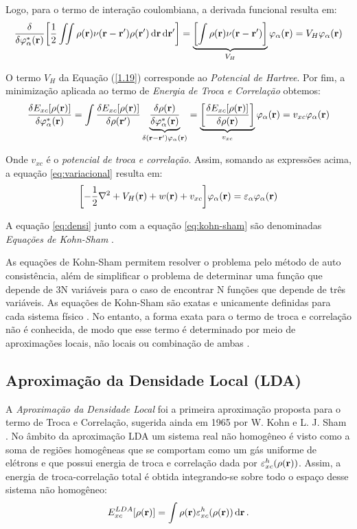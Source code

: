 Logo, para o termo de interação coulombiana, a derivada funcional resulta em:
\begin{equation}\label{1.19}
	\fdv{}{\phialfac}\bqty{\frac{1}{2}\iint \dens\nu(\vb{r}-\vb{r'})\denslinha \dr \drlinha }=\underbrace{\bqty{\int \dens \nu(\vb{r}-\vb{r'})}}_{\text{$V_H$}}\phialfa = V_H \phialfa
\end{equation}

O termo $ V_H $ da Equação (\ref{1.19}) corresponde ao \textit{Potencial de Hartree}. Por fim, a minimização aplicada ao termo de \textit{Energia de Troca e Correlação} obtemos:
\begin{equation}\label{eq:derivada_correlacao}
	\fdv{E_{xc}\bqty{\dens}}{\phialfac}=\int \fdv{E_{xc}\bqty{\dens}}{\denslinha}\underbrace{\fdv{\dens}{\phialfac}}_{\delta(\vb{r}-\vb{r'})\phialfa}=\underbrace{\bqty{\fdv{E_{xc}\bqty{\dens}}{\dens}}}_{\text{$v_{xc}$}}\phialfa = v_{xc} \phialfa
\end{equation}

Onde $ v_{xc} $ é o \textit{potencial de troca e correlação}. Assim, somando as expressões acima, a equação \eqref{eq:variacional} resulta em:
\begin{equation}\label{eq:kohn-sham}
	\bqty{-\frac{1}{2}\laplacian+V_H(\vb{r})+w(\vb{r})+v_{xc}}\phialfa=\varepsilon_{\alpha} \phialfa
\end{equation}

A equação \eqref{eq:densi} junto com a equação \eqref{eq:kohn-sham} são denominadas \textit{Equações de Kohn-Sham} \cite{lecture_KS}.

As equações de Kohn-Sham permitem resolver o problema pelo método de auto consistência, além de simplificar o problema de determinar uma função que depende de 3N variáveis para o caso de encontrar N funções que depende de três variáveis. As equações de Kohn-Sham são exatas e unicamente definidas para cada sistema físico \cite{abc_dft}. No entanto, a forma exata para o termo de troca e correlação não é conhecida, de modo que esse termo é determinado por meio de aproximações locais, não locais ou combinação de ambas \cite{fazio_livro}.




\subsection{Aproximação da Densidade Local (LDA)}

A \textit{Aproximação da Densidade Local} foi a primeira aproximação proposta para o termo de Troca e Correlação, sugerida ainda em 1965 por W. Kohn e L. J. Sham \cite{kohn_sham}. No âmbito da aproximação LDA um sistema real não homogêneo é visto como a soma de regiões homogêneas que se comportam como um gás uniforme de elétrons e que possui energia de troca e correlação dada por $\varepsilon_{xc}^{h}(\rho(\vb{r})) $. Assim, a energia de troca-correlação total é obtida integrando-se sobre todo o espaço desse sistema não homogêneo:
\begin{equation}
	E^{LDA}_{xc}\bqty{\dens}=\int \dens\varepsilon_{xc}^{h}(\dens)\dr.
\end{equation}

